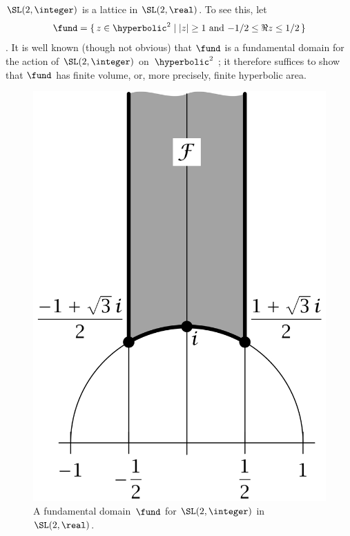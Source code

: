 \begin{eg} \label{SL2Zlatt}
 $\SL(2,\integer)$ is a lattice in $\SL(2,\real)$. To see this, let
 \begin{equation} \label{SL2ZFundDom}
 \fund = \{\, z \in \hyperbolic^2 \mid \mbox{$|z|
\ge 1$ and $-1/2 \le \Re z \le 1/2$} \,\} 
 \end{equation}
 . It is well known (though not obvious) that
$\fund$ is a fundamental domain for the action of $\SL(2,\integer)$
on~$\hyperbolic^2$ ; it
therefore suffices to show that $\fund$ has finite volume, or, more
precisely, finite hyperbolic area. 

\begin{figure}[t]
 \includegraphics{PDF/FundDomSL2R.jpg}
 \caption{A fundamental domain~$\fund$ for $\SL(2,\integer)$ in
$\SL(2,\real)$.} \label{FundDomSL2R}
 \end{figure}

\end{eg}
